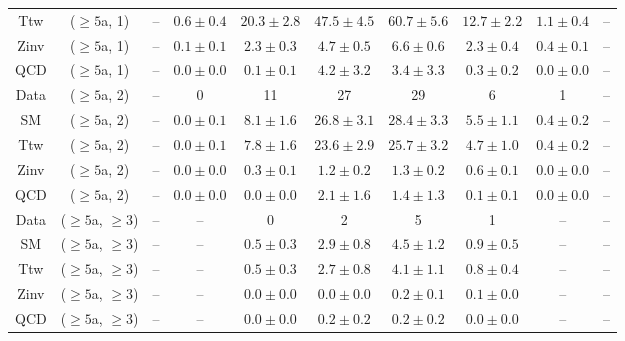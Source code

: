 \begin{table}[h!]
{\begin{tabular}{cccccccccc}
	Ttw & ($\ge5$a, 1) & -- & $0.6\pm 0.4$ & $20.3\pm 2.8$ & $47.5\pm 4.5$ & $60.7\pm 5.6$ & $12.7\pm 2.2$ & $1.1\pm 0.4$ & -- \\[0.5ex] 
	Zinv & ($\ge5$a, 1) & -- & $0.1\pm 0.1$ & $2.3\pm 0.3$ & $4.7\pm 0.5$ & $6.6\pm 0.6$ & $2.3\pm 0.4$ & $0.4\pm 0.1$ & -- \\[0.5ex] 
	QCD & ($\ge5$a, 1) & -- & $0.0\pm 0.0$ & $0.1\pm 0.1$ & $4.2\pm 3.2$ & $3.4\pm 3.3$ & $0.3\pm 0.2$ & $0.0\pm 0.0$ & -- \\[0.5ex] 
	Data & ($\ge5$a, 2) & -- & 0 & 11 & 27 & 29 & 6 & 1 & -- \\[0.5ex] 
	SM & ($\ge5$a, 2) & -- & $0.0\pm 0.1$ & $8.1\pm 1.6$ & $26.8\pm 3.1$ & $28.4\pm 3.3$ & $5.5\pm 1.1$ & $0.4\pm 0.2$ & -- \\[0.5ex] 
	Ttw & ($\ge5$a, 2) & -- & $0.0\pm 0.1$ & $7.8\pm 1.6$ & $23.6\pm 2.9$ & $25.7\pm 3.2$ & $4.7\pm 1.0$ & $0.4\pm 0.2$ & -- \\[0.5ex] 
	Zinv & ($\ge5$a, 2) & -- & $0.0\pm 0.0$ & $0.3\pm 0.1$ & $1.2\pm 0.2$ & $1.3\pm 0.2$ & $0.6\pm 0.1$ & $0.0\pm 0.0$ & -- \\[0.5ex] 
	QCD & ($\ge5$a, 2) & -- & $0.0\pm 0.0$ & $0.0\pm 0.0$ & $2.1\pm 1.6$ & $1.4\pm 1.3$ & $0.1\pm 0.1$ & $0.0\pm 0.0$ & -- \\[0.5ex] 
	Data & ($\ge5$a, $\ge3$) & -- & -- & 0 & 2 & 5 & 1 & -- & -- \\[0.5ex] 
	SM & ($\ge5$a, $\ge3$) & -- & -- & $0.5\pm 0.3$ & $2.9\pm 0.8$ & $4.5\pm 1.2$ & $0.9\pm 0.5$ & -- & -- \\[0.5ex] 
	Ttw & ($\ge5$a, $\ge3$) & -- & -- & $0.5\pm 0.3$ & $2.7\pm 0.8$ & $4.1\pm 1.1$ & $0.8\pm 0.4$ & -- & -- \\[0.5ex] 
	Zinv & ($\ge5$a, $\ge3$) & -- & -- & $0.0\pm 0.0$ & $0.0\pm 0.0$ & $0.2\pm 0.1$ & $0.1\pm 0.0$ & -- & -- \\[0.5ex] 
	QCD & ($\ge5$a, $\ge3$) & -- & -- & $0.0\pm 0.0$ & $0.2\pm 0.2$ & $0.2\pm 0.2$ & $0.0\pm 0.0$ & -- & -- \\[0.5ex] 
	\hline
	\hline
\end{tabular}}
\end{table}
